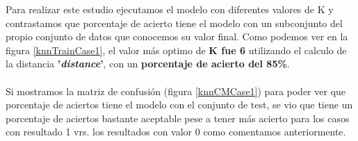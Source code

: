 Para realizar este estudio ejecutamos el modelo con diferentes valores de K y contrastamos que porcentaje de acierto tiene el modelo con un subconjunto del propio conjunto de datos que conocemos su valor final. Como podemos ver en la figura \ref{knnTrainCase1}, el valor más optimo de \textbf{K fue 6} utilizando el calculo de la distancia \textbf{'\textit{distance}'}, con un \textbf{porcentaje de acierto del 85\%}.

\paragraph{}
Si mostramos la matriz de confusión\cite{ref:confusion_matrix} (figura \ref{knnCMCase1}) para poder ver que porcentaje de aciertos tiene el modelo con el conjunto de test, se vio que tiene un porcentaje de aciertos bastante aceptable pese a tener más acierto para los casos con resultado 1 vrs. los resultados con valor 0 como comentamos anteriormente.

